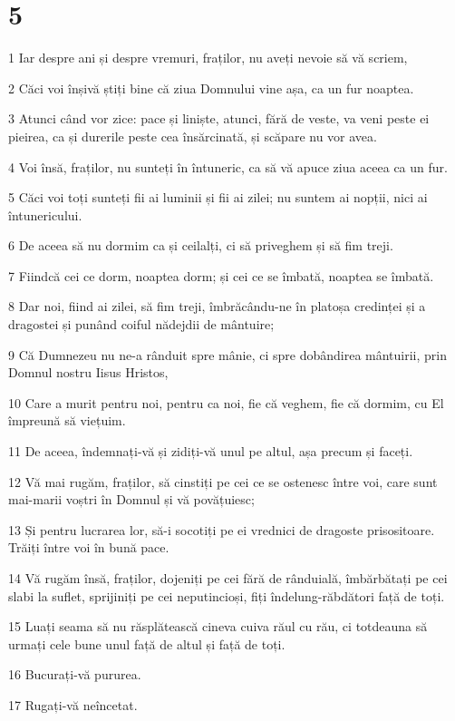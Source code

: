 \chapter{5}

\par 1 Iar despre ani și despre vremuri, fraților, nu aveți nevoie să vă scriem,
\par 2 Căci voi înșivă știți bine că ziua Domnului vine așa, ca un fur noaptea.
\par 3 Atunci când vor zice: pace și liniște, atunci, fără de veste, va veni peste ei pieirea, ca și durerile peste cea însărcinată, și scăpare nu vor avea.
\par 4 Voi însă, fraților, nu sunteți în întuneric, ca să vă apuce ziua aceea ca un fur.
\par 5 Căci voi toți sunteți fii ai luminii și fii ai zilei; nu suntem ai nopții, nici ai întunericului.
\par 6 De aceea să nu dormim ca și ceilalți, ci să priveghem și să fim treji.
\par 7 Fiindcă cei ce dorm, noaptea dorm; și cei ce se îmbată, noaptea se îmbată.
\par 8 Dar noi, fiind ai zilei, să fim treji, îmbrăcându-ne în platoșa credinței și a dragostei și punând coiful nădejdii de mântuire;
\par 9 Că Dumnezeu nu ne-a rânduit spre mânie, ci spre dobândirea mântuirii, prin Domnul nostru Iisus Hristos,
\par 10 Care a murit pentru noi, pentru ca noi, fie că veghem, fie că dormim, cu El împreună să viețuim.
\par 11 De aceea, îndemnați-vă și zidiți-vă unul pe altul, așa precum și faceți.
\par 12 Vă mai rugăm, fraților, să cinstiți pe cei ce se ostenesc între voi, care sunt mai-marii voștri în Domnul și vă povățuiesc;
\par 13 Și pentru lucrarea lor, să-i socotiți pe ei vrednici de dragoste prisositoare. Trăiți între voi în bună pace.
\par 14 Vă rugăm însă, fraților, dojeniți pe cei fără de rânduială, îmbărbătați pe cei slabi la suflet, sprijiniți pe cei neputincioși, fiți îndelung-răbdători față de toți.
\par 15 Luați seama să nu răsplătească cineva cuiva răul cu rău, ci totdeauna să urmați cele bune unul față de altul și față de toți.
\par 16 Bucurați-vă pururea.
\par 17 Rugați-vă neîncetat.

